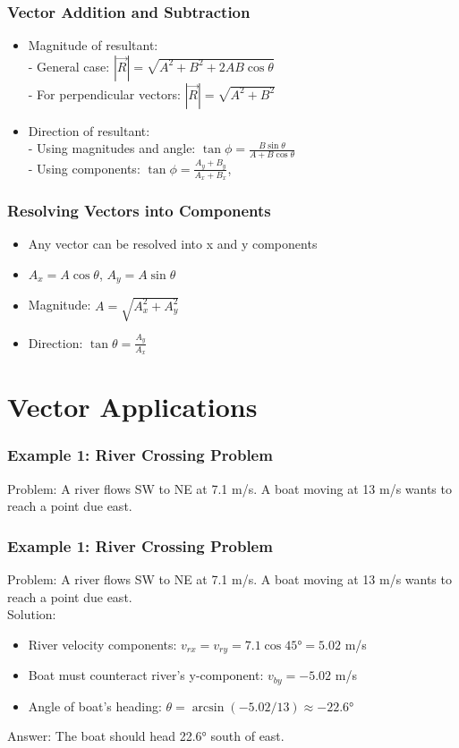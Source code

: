 \documentclass{beamer}
\begin{document}
\begin{frame}
\frametitle{Vector Addition and Subtraction}
\begin{itemize}
\item Magnitude of resultant:\\
- General case: $|\vec{R}| = \sqrt{A^2 + B^2 + 2AB\cos\theta}$\\
- For perpendicular vectors: $|\vec{R}| = \sqrt{A^2 + B^2}$

\item Direction of resultant:\\
- Using magnitudes and angle: $\tan\phi = \frac{B\sin\theta}{A + B\cos\theta}$\\
- Using components: $\tan\phi = \frac{A_y + B_y}{A_x + B_x}$, 

\end{itemize}
\end{frame}

\begin{frame}
\frametitle{Resolving Vectors into Components}
\begin{itemize}
    \item Any vector can be resolved into x and y components
    \item $A_x = A\cos\theta$, $A_y = A\sin\theta$
    \item Magnitude: $A = \sqrt{A_x^2 + A_y^2}$
    \item Direction: $\tan\theta = \frac{A_y}{A_x}$
\end{itemize}
\end{frame}

\section{Vector Applications}

\begin{frame}
\frametitle{Example 1: River Crossing Problem}
Problem: A river flows SW to NE at 7.1 m/s. A boat moving at 13 m/s wants to reach a point due east.


\end{frame}
\begin{frame}
\frametitle{Example 1: River Crossing Problem}
Problem: A river flows SW to NE at 7.1 m/s. A boat moving at 13 m/s wants to reach a point due east.\\

Solution:
\begin{itemize}
    \item River velocity components: $v_{rx} = v_{ry} = 7.1\cos45° = 5.02$ m/s
    \item Boat must counteract river's y-component: $v_{by} = -5.02$ m/s
    \item Angle of boat's heading: $\theta = \arcsin(-5.02/13) \approx -22.6°$
\end{itemize}
Answer: The boat should head 22.6° south of east.
\end{frame}
\end{document}
